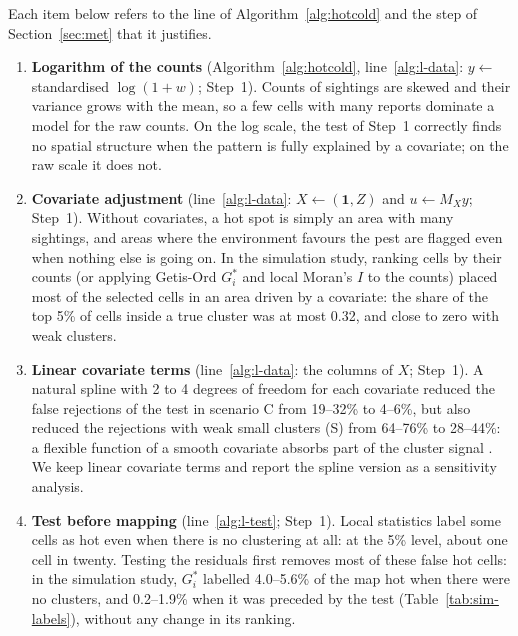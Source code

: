 
Each item below refers to the line of Algorithm~\ref{alg:hotcold} and the step of Section~\ref{sec:met} that it justifies.

\begin{enumerate}

\item\label{ch:log} \textbf{Logarithm of the counts} (Algorithm~\ref{alg:hotcold}, line~\ref{alg:l-data}: $y\gets$ standardised $\log(1+w)$; Step~1).
Counts of sightings are skewed and their variance grows with the mean, so a few cells with many reports dominate a model for the raw counts. On the log scale, the test of Step~1 correctly finds no spatial structure when the pattern is fully explained by a covariate; on the raw scale it does not.

\item\label{ch:cov} \textbf{Covariate adjustment} (line~\ref{alg:l-data}: $X\gets(\mathbf{1},Z)$ and $u\gets M_Xy$; Step~1).
Without covariates, a hot spot is simply an area with many sightings, and areas where the environment favours the pest are flagged even when nothing else is going on. In the simulation study, ranking cells by their counts (or applying Getis-Ord $G_i^*$ and local Moran's $I$ to the counts) placed most of the selected cells in an area driven by a covariate: the share of the top 5\% of cells inside a true cluster was at most 0.32, and close to zero with weak clusters.

\item\label{ch:lin} \textbf{Linear covariate terms} (line~\ref{alg:l-data}: the columns of $X$; Step~1).
A natural spline with 2 to 4 degrees of freedom for each covariate reduced the false rejections of the test in scenario C from 19--32\% to 4--6\%, but also reduced the rejections with weak small clusters (S) from 64--76\% to 28--44\%: a flexible function of a smooth covariate absorbs part of the cluster signal \citep{hodges2010adding}. We keep linear covariate terms and report the spline version as a sensitivity analysis.

\item\label{ch:test} \textbf{Test before mapping} (line~\ref{alg:l-test}; Step~1).
Local statistics label some cells as hot even when there is no clustering at all: at the 5\% level, about one cell in twenty. Testing the residuals first removes most of these false hot cells: in the simulation study, $G_i^*$ labelled 4.0--5.6\% of the map hot when there were no clusters, and 0.2--1.9\% when it was preceded by the test (Table~\ref{tab:sim-labels}), without any change in its ranking. %


\end{enumerate}
